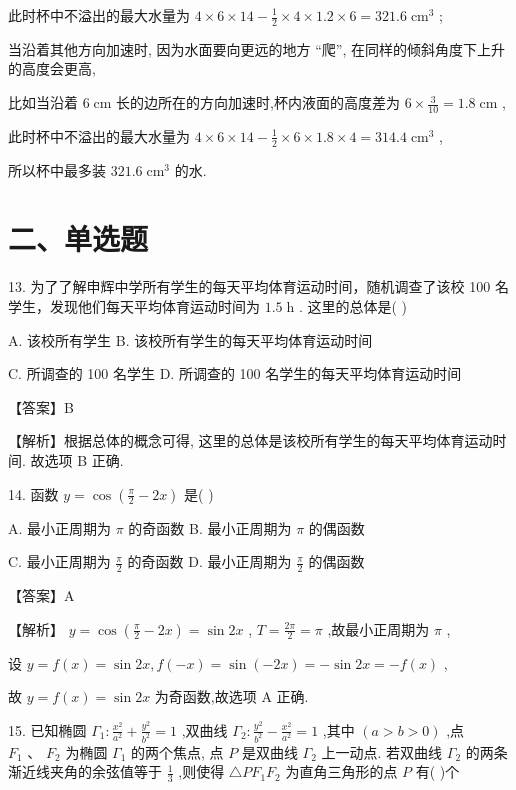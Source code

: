 \documentclass[10pt]{article}
\begin{document}
此时杯中不溢出的最大水量为 \(4 \times  6 \times  {14} - \frac{1}{2} \times  4 \times  {1.2} \times  6 = {321.6}{\mathrm{\;{cm}}}^{3}\) ;

当沿着其他方向加速时, 因为水面要向更远的地方 “爬”, 在同样的倾斜角度下上升的高度会更高,

比如当沿着 \(6\mathrm{\;{cm}}\) 长的边所在的方向加速时,杯内液面的高度差为 \(6 \times  \frac{3}{10} = {1.8}\mathrm{\;{cm}}\) ,

此时杯中不溢出的最大水量为 \(4 \times  6 \times  {14} - \frac{1}{2} \times  6 \times  {1.8} \times  4 = {314.4}{\mathrm{\;{cm}}}^{3}\) ,

所以杯中最多装 \({321.6}{\mathrm{\;{cm}}}^{3}\) 的水.

\section*{二、单选题}

13. 为了了解申辉中学所有学生的每天平均体育运动时间，随机调查了该校 100 名学生，发现他们每天平均体育运动时间为 \({1.5}\mathrm{\;h}\) . 这里的总体是( )

A. 该校所有学生 B. 该校所有学生的每天平均体育运动时间

C. 所调查的 100 名学生 D. 所调查的 100 名学生的每天平均体育运动时间

【答案】B

【解析】根据总体的概念可得, 这里的总体是该校所有学生的每天平均体育运动时间. 故选项 B 正确.

14. 函数 \(y = \cos \left( {\frac{\pi }{2} - {2x}}\right)\) 是( )

A. 最小正周期为 \(\pi\) 的奇函数 B. 最小正周期为 \(\pi\) 的偶函数

C. 最小正周期为 \(\frac{\pi }{2}\) 的奇函数 D. 最小正周期为 \(\frac{\pi }{2}\) 的偶函数

【答案】A

【解析】 \(y = \cos \left( {\frac{\pi }{2} - {2x}}\right)  = \sin {2x}\) , \(T = \frac{2\pi }{2} = \pi\) ,故最小正周期为 \(\pi\) ,

设 \(y = f\left( x\right)  = \sin {2x},f\left( {-x}\right)  = \sin \left( {-{2x}}\right)  =  - \sin {2x} =  - f\left( x\right)\) ,

故 \(y = f\left( x\right)  = \sin {2x}\) 为奇函数,故选项 \(\mathrm{A}\) 正确.

15. 已知椭圆 \({\Gamma }_{1} : \frac{{x}^{2}}{{a}^{2}} + \frac{{y}^{2}}{{b}^{2}} = 1\) ,双曲线 \({\Gamma }_{2} : \frac{{y}^{2}}{{b}^{2}} - \frac{{x}^{2}}{{a}^{2}} = 1\) ,其中 \(\left( {a > b > 0}\right)\) ,点 \({F}_{1}\text{ 、 }{F}_{2}\) 为椭圆 \({\Gamma }_{1}\) 的两个焦点, 点 \(P\) 是双曲线 \({\Gamma }_{2}\) 上一动点. 若双曲线 \({\Gamma }_{2}\) 的两条渐近线夹角的余弦值等于 \(\frac{1}{3}\) ,则使得 \(\bigtriangleup P{F}_{1}{F}_{2}\) 为直角三角形的点 \(P\) 有( )个
\end{document}
